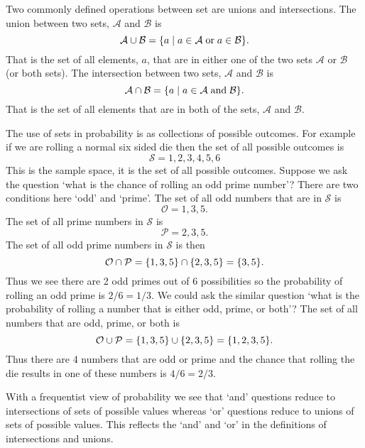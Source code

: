         Two commonly defined operations between set are unions and intersections.
        The union between two sets, \(\mathcal{A}\) and \(\mathcal{B}\) is
        \[\mathcal{A} \cup \mathcal{B} = \{a\mid a\in\mathcal{A}\;\text{or}\;a\in\mathcal{B}\}.\]
        That is the set of all elements, \(a\), that are in either one of the two sets \(\mathcal{A}\) or \(\mathcal{B}\) (or both sets).
        The intersection between two sets, \(\mathcal{A}\) and \(\mathcal{B}\) is
        \[\mathcal{A} \cap \mathcal{B} = \{a\mid a\in \mathcal{A}\;\text{and}\;\mathcal{B}\}.\]
        That is the set of all elements that are in both of the sets, \(\mathcal{A}\) and \(\mathcal{B}\).
        
        The use of sets in probability is as collections of possible outcomes.
        For example if we are rolling a normal six sided die then the set of all possible outcomes is
        \[\mathcal{S} = {1, 2, 3, 4, 5, 6}\]
        This is the sample space, it is the set of all possible outcomes.
        Suppose we ask the question `what is the chance of rolling an odd prime number'?
        There are two conditions here `odd' and `prime'.
        The set of all odd numbers that are in \(\mathcal{S}\) is
        \[\mathcal{O} = {1, 3, 5}.\]
        The set of all prime numbers in \(\mathcal{S}\) is
        \[\mathcal{P} = {2, 3, 5}.\]
        The set of all odd prime numbers in \(\mathcal{S}\) is then
        \[\mathcal{O} \cap \mathcal{P} = \{1, 3, 5\} \cap \{2, 3, 5\} = \{3, 5\}.\]
        Thus we see there are 2 odd primes out of 6 possibilities so the probability of rolling an odd prime is \(2/6 = 1/3\).
        We could ask the similar question `what is the probability of rolling a number that is either odd, prime, or both'?
        The set of all numbers that are odd, prime, or both is
        \[\mathcal{O} \cup \mathcal{P} = \{1, 3, 5\} \cup \{2, 3, 5\} = \{1, 2, 3, 5\}.\]
        Thus there are 4 numbers that are odd or prime and the chance that rolling the die results in one of these numbers is \(4/6 = 2/3\).
        
        With a frequentist view of probability we see that `and' questions reduce to intersections of sets of possible values whereas `or' questions reduce to unions of sets of possible values.
        This reflects the `and' and `or' in the definitions of intersections and unions.
        

